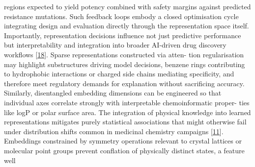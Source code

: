 \documentclass[
]{article}
\begin{document}
regions expected to yield potency combined with safety margins against
predicted resistance mutations. Such feedback loops embody a closed
optimisation cycle integrating design and evaluation directly through
the representation space itself. Importantly, representation decisions
influence not just predictive performance but interpretability and
integration into broader AI-driven drug discovery workflows
{[}\hyperref[_bookmark58]{18}{]}. Sparse representations constructed via
atten- tion regularisation may highlight substructures driving model
decisions, benzene rings contributing to hydrophobic interactions or
charged side chains mediating specificity, and therefore meet regulatory
demands for explanation without sacrificing accuracy. Similarly,
disentangled embedding dimensions can be engineered so that individual
axes correlate strongly with interpretable chemoinformatic proper- ties
like logP or polar surface area. The integration of physical knowledge
into learned representations mitigates purely statistical associations
that might otherwise fail under distribution shifts common in medicinal
chemistry campaigns {[}\hyperref[_bookmark51]{11}{]}. Embeddings
constrained by symmetry operations relevant to crystal lattices or
molecular point groups prevent conflation of physically distinct states,
a feature well
\end{document}
